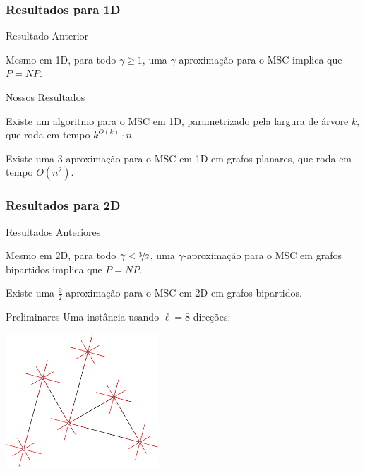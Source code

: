 \subsubsection{Resultados para 1D}

\begin{frame}{Resultado Anterior}
  \begin{thm}
    Mesmo em 1D, para todo $\gamma \geq 1$, uma $\gamma$-aproximação para o MSC implica que $P = NP$.
  \end{thm}
\end{frame}

\begin{frame}{Nossos Resultados}
  \begin{thm}
    Existe um algoritmo \FPT para o MSC em 1D, parametrizado pela largura de árvore $k$, que roda em tempo $k^{O(k)} \cdot n$.
  \end{thm}

  \pause
  \begin{cor}
    Existe uma $3$-aproximação para o MSC em 1D em grafos planares, que roda em tempo $O(n^2)$.
  \end{cor}
\end{frame}


\subsubsection{Resultados para 2D}

\begin{frame}{Resultados Anteriores}
  \begin{thm}
    Mesmo em 2D, para todo $\gamma < \nicefrac{3}{2}$, uma $\gamma$-aproximação para o MSC em grafos bipartidos implica que $P = NP$.
  \end{thm}

  \pause
  \begin{thm}
    Existe uma $\frac{9}{2}$-aproximação para o MSC em 2D em grafos bipartidos.
  \end{thm}
\end{frame}

\begin{frame}{Preliminares}
  \centering
  Uma instância usando $\ell=8$ direções:

  \bigskip
  \begin{minipage}{\linewidth}
    \centering
    \includegraphics[height=5cm]{MSC/directions.png}
  \end{minipage}
\end{frame}

